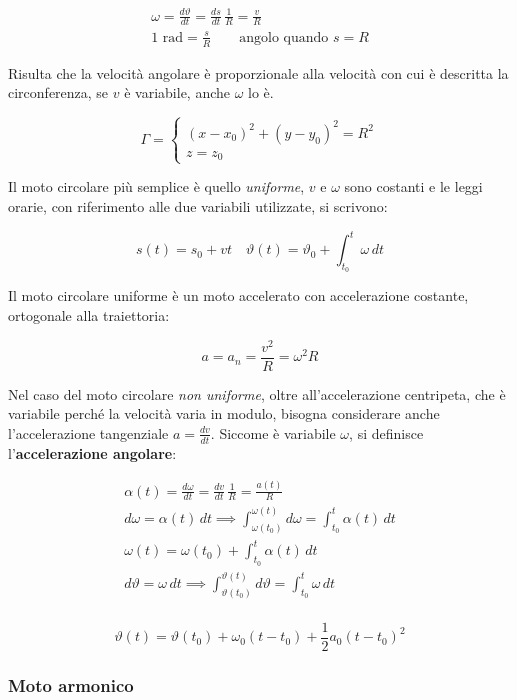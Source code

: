 \begin{gather*}
	\omega=\frac{d\vartheta}{dt}=\frac{ds}{dt}\,\frac{1}{R}=\frac{v}{R}\\
	1 \text{ rad}=\frac{s}{R} \qquad \text{angolo quando $s=R$}
\end{gather*}

Risulta che la velocità angolare è proporzionale alla velocità con cui è descritta la circonferenza, se $v$ è variabile, anche $\omega$ lo è.

\[
	\Gamma=
	\begin{cases}
		(x-x_0)^2+(y-y_0)^2=R^2 \\
		z=z_0
	\end{cases}
\]

Il moto circolare più semplice è quello \emph{uniforme}, $v$ e $\omega$ sono costanti e le leggi orarie, con riferimento alle due variabili utilizzate, si scrivono:

\[
	s(t)=s_0+vt \quad \vartheta(t)=\vartheta_0+\int^t_{t_0} \omega\,dt
\]

Il moto circolare uniforme è un moto accelerato con accelerazione costante, ortogonale alla traiettoria:

\[
	a=a_n=\frac{v^2}{R}=\omega^2 R
\]

Nel caso del moto circolare \emph{non uniforme}, oltre all'accelerazione centripeta, che è variabile perché la velocità varia in modulo, bisogna considerare anche l'accelerazione tangenziale $a = \frac{dv}{dt}$. Siccome è variabile $\omega$, si definisce l'\textbf{accelerazione angolare}:

\begin{gather*}
	\alpha(t)=\frac{d\omega}{dt}=\frac{dv}{dt}\,\frac{1}{R}= \frac{a(t)}{R} \\
	d\omega=\alpha(t) \,dt \implies \int^{\omega(t)}_{\omega(t_0)} d\omega=\int^t_{t_0} \alpha(t)\,dt \\
	\omega(t)=\omega(t_0)+\int^t_{t_0}\alpha(t)\,dt \\
	d\vartheta=\omega\,dt \implies \int^{\vartheta(t)}_{\vartheta(t_0)} d\vartheta =\int^t_{t_0}\omega\,dt \\
\end{gather*}

\begin{equation}
	\boxed{\vartheta(t)=\vartheta(t_0)+\omega_0(t-t_0)+\frac{1}{2}a_0(t-t_0)^2}
\end{equation}

\subsubsection{Moto armonico}

